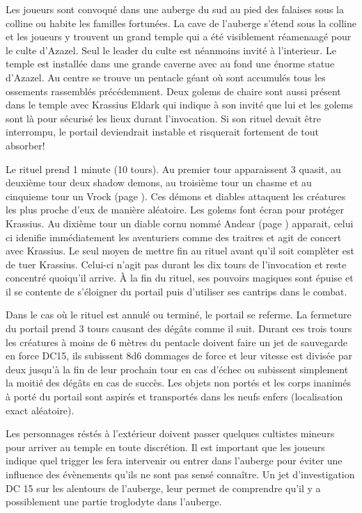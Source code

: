 Les joueurs sont convoqué dans une auberge du sud au pied des falaises 
sous la colline ou habite les familles fortunées. La cave de l'auberge s'étend 
sous la colline et les joueurs y trouvent un grand temple qui a été visiblement 
réamenaagé pour le culte d'Azazel. Seul le leader du culte est néanmoins invité à
l'interieur. Le temple est installée dans une grande caverne avec au fond une 
énorme statue d'Azazel. Au centre se trouve un pentacle géant où sont accumulés
tous les ossements rassemblés précédemment. Deux golems de chaire sont aussi
présent dans le temple avec Krassius Eldark qui indique à son invité que lui 
et les golems sont là pour sécurisé les lieux durant l'invocation. Si son rituel
devait être interrompu, le portail deviendrait instable et risquerait fortement 
de tout absorber!

Le rituel prend 1 minute (10 tours). Au premier tour apparaissent 3 quasit,
au deuxième tour deux shadow demons, au troisième tour un chasme et au cinquieme
tour un Vrock (page \pageref{Vrock}). Ces démons et diables attaquent les créatures
les plus proche d'eux de manière aléatoire. Les golems font écran pour protéger
Krassius. Au dixième tour un diable cornu nommé
Andear (page \pageref{DiableCornu}) apparait, celui ci idenifie immédiatement 
les aventuriers comme des traitres et agit de concert avec Krassius. Le seul moyen
de mettre fin au rituel avant qu'il soit complèter est de tuer Krassius. Celui-ci
n'agit pas durant les dix tours de l'invocation et reste concentré quoiqu'il arrive.
À la fin du rituel, ses pouvoirs magiques sont épuise et il se contente de s'éloigner
du portail puis d'utiliser ses cantrips dans le combat.


Dans le cas où le rituel est annulé ou terminé, le portail se referme.
La fermeture du portail prend 3 tours causant des dégâts comme il suit. 
Durant ces trois tours les créatures à
moins de 6 mètres du pentacle doivent faire un jet de sauvegarde en force DC15, 
ils subissent 8d6 dommages de force et leur vitesse est divisée par deux jusqu'à 
la fin de leur prochain tour en cas d'échec ou subissent simplement la moitié des dégâts 
en cas de succès. Les objets non portés et les corps inanimés à porté du portail
sont aspirés et transportés dans les neufs enfers (localisation exact aléatoire).

Les personnages réstés à l'extérieur doivent passer quelques cultistes mineurs 
pour arriver au temple en toute discrétion. Il est important que les joueurs
indique quel trigger les fera intervenir ou entrer dans l'auberge pour éviter
une influence des évènements qu'ils ne sont pas sensé connaître. Un jet 
d'investigation DC 15 sur les alentours de l'auberge, leur permet de comprendre 
qu'il y a possiblement une partie troglodyte dans l'auberge.


